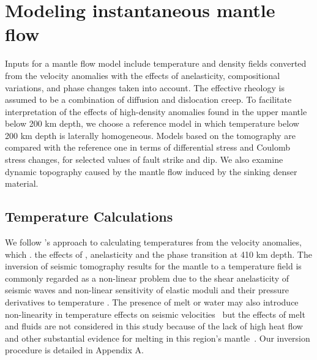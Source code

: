 \documentclass[draft,linenumbers]{agujournal2018}
\begin{document}
\section{Modeling instantaneous mantle flow}
    Inputs for a mantle flow model include temperature and density fields converted from the velocity anomalies with the effects of anelasticity, compositional variations, and phase changes taken into account. The effective rheology is assumed to be a combination of diffusion and dislocation creep. To facilitate interpretation of the effects of high-density anomalies found in the upper mantle below 200 km depth, we choose a reference model in which temperature below 200 km depth is laterally homogeneous. Models based on the tomography are compared with the reference one in terms of differential stress and Coulomb stress changes, for selected values of fault strike and dip. We also examine dynamic topography caused by the mantle flow induced by the sinking denser material.
    
\subsection{Temperature Calculations} \label{temp_var}
    We follow \citet{Cammarano2003}'s approach to calculating temperatures from the velocity anomalies, which  . the effects of , anelasticity and the phase transition at 410 km depth. The inversion of seismic tomography results for the mantle to a temperature field is commonly regarded as a non-linear problem due to the shear anelasticity of seismic waves \citep{minster1981model, karato1993importance, sobolev1996upper, Goes_2000, artemieva2004shear} and non-linear sensitivity of elastic moduli and their pressure derivatives to temperature \citep{duffy1989seismic, anderson1992high, Cammarano2003, stixrude2005thermodynamics}. The presence of melt or water may also introduce non-linearity in temperature effects on seismic velocities~\citep{Karato_1998} but the effects of melt and fluids are not considered in this study because of the lack of high heat flow and other substantial evidence for melting in this region's mantle~\citep{blackwell2006assessment}. Our inversion procedure is detailed in Appendix A.
%
    
\end{document}
